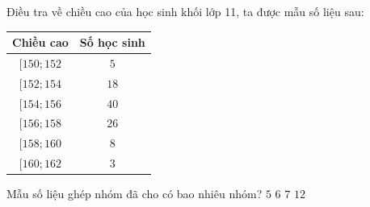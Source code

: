 \begin{ex}%
	Điều tra về chiều cao của học sinh khối lớp 11, ta được mẫu số liệu sau: 
	\begin{center}
		\begin{tabular}{|c|c|}
			 \hline
			Chiều cao &  Số học sinh \\
			\hline 
			$[150{;}152$ & $5$  \\
			\hline 
			$[152{;}154$ & $18$  \\
			 \hline
			 $[154{;}156$ & $40$ \\
			 \hline
			$[156{;}158$ & $26$ \\ 
			 \hline
			$[158{;}160$ & $8$ \\ 
			 \hline
			 $[160{;}162$ & $3$ \\
			\hline 
		\end{tabular}
	\end{center}
	Mẫu  số liệu ghép nhóm đã cho có bao nhiêu nhóm?
	 \choice
		 {$5$}
		{\True  $6$}
		{$7$} 
		{$12$} 
	 \loigiai{
		Có $6$ nhóm số  liệu ở bảng trên là $[150{;}152$, $[152{;}154$, $[154{;}156$, $[156{;}158$, $[158{;}160$, $[160{;}162$.
	} 
\end{ex}

